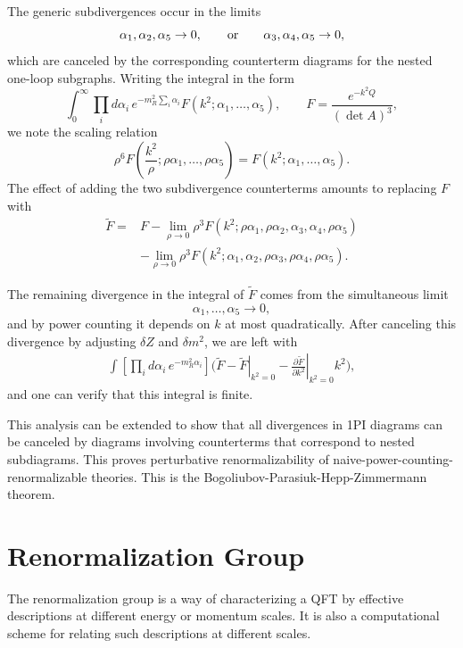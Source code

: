The generic subdivergences occur in the limits
\[
  \alpha_1,\alpha_2,\alpha_5\to0,
  \qquad\hbox{or}\qquad
  \alpha_3,\alpha_4,\alpha_5\to0,
\]
which are canceled by the corresponding counterterm diagrams for the nested
one-loop subgraphs.  Writing the integral in the form
\[
  \int_0^\infty\prod_i d\alpha_i\,
  e^{-m_R^2\sum_i\alpha_i}
  F(k^2;\alpha_1,\ldots,\alpha_5),
  \qquad
  F=\frac{e^{-k^2Q}}{(\det A)^3},
\]
we note the scaling relation
\[
  \rho^6 F\!\left(
    \frac{k^2}{\rho};
    \rho\alpha_1,\ldots,\rho\alpha_5
  \right)
  =
  F(k^2;\alpha_1,\ldots,\alpha_5).
\]
The effect of adding the two subdivergence counterterms amounts to replacing
\(F\) with
\[
\begin{split}
  \widetilde F
  ={}&F
  -\lim_{\rho\to0}
   \rho^3F(k^2;\rho\alpha_1,\rho\alpha_2,\alpha_3,\alpha_4,\rho\alpha_5)
  \\
  &-\lim_{\rho\to0}
   \rho^3F(k^2;\alpha_1,\alpha_2,\rho\alpha_3,\rho\alpha_4,\rho\alpha_5).
\end{split}
\]

The remaining divergence in the integral of \(\widetilde F\) comes from the
simultaneous limit
\[
  \alpha_1,\ldots,\alpha_5\to0,
\]
and by power counting it depends on \(k\) at most quadratically.  After
canceling this divergence by adjusting \(\delta Z\) and \(\delta m^2\), we are
left with
\[
\begin{split}
  \int\left[\prod_i d\alpha_i\,e^{-m_R^2\alpha_i}\right]
  \bigg(
  \widetilde F
  -\left.\widetilde F\right|_{k^2=0}
  -\left.
    \frac{\partial\widetilde F}{\partial k^2}
   \right|_{k^2=0}k^2
  \bigg),
\end{split}
\]
and one can verify that this integral is finite.

This analysis can be extended to show that all divergences in 1PI diagrams can
be canceled by diagrams involving counterterms that correspond to nested
subdiagrams.  This proves perturbative renormalizability of
naive-power-counting-renormalizable theories.  This is the
Bogoliubov-Parasiuk-Hepp-Zimmermann theorem.

\section{Renormalization Group}

The renormalization group is a way of characterizing a QFT by effective
descriptions at different energy or momentum scales.  It is also a
computational scheme for relating such descriptions at different scales.

